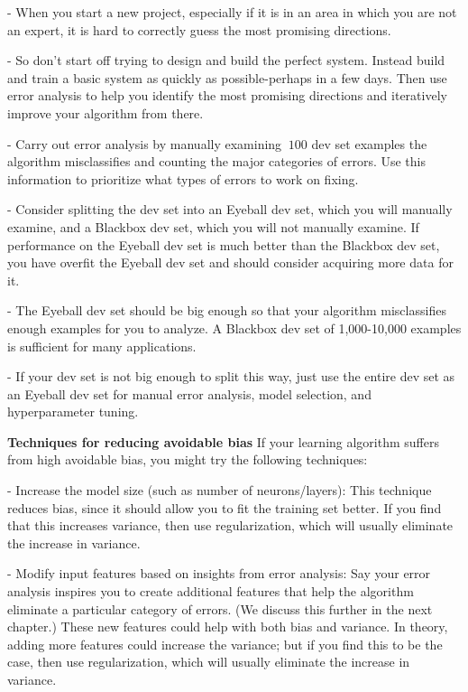 \documentclass[openany]{book}
\begin{document}
- When you start a new project, especially if it is in an area in which you are not an expert, it is hard to correctly guess the most promising directions.

- So don't start off trying to design and build the perfect system. Instead build and train a basic system as quickly as possible-perhaps in a few days. Then use error analysis to help you identify the most promising directions and iteratively improve your algorithm from there.

- Carry out error analysis by manually examining $~ 100$ dev set examples the algorithm misclassifies and counting the major categories of errors. Use this information to prioritize what types of errors to work on fixing.

- Consider splitting the dev set into an Eyeball dev set, which you will manually examine, and a Blackbox dev set, which you will not manually examine. If performance on the Eyeball dev set is much better than the Blackbox dev set, you have overfit the Eyeball dev set and should consider acquiring more data for it.

- The Eyeball dev set should be big enough so that your algorithm misclassifies enough examples for you to analyze. A Blackbox dev set of 1,000-10,000 examples is sufficient for many applications.

- If your dev set is not big enough to split this way, just use the entire dev set as an Eyeball dev set for manual error analysis, model selection, and hyperparameter tuning.


\textbf{Techniques for reducing avoidable bias
}If your learning algorithm suffers from high avoidable bias, you might try the following techniques:

- Increase the model size (such as number of neurons/layers): This technique reduces bias, since it should allow you to fit the training set better. If you find that this increases variance, then use regularization, which will usually eliminate the increase in variance.

- Modify input features based on insights from error analysis: Say your error analysis inspires you to create additional features that help the algorithm eliminate a particular category of errors. (We discuss this further in the next chapter.) These new features could help with both bias and variance. In theory, adding more features could increase the variance; but if you find this to be the case, then use regularization, which will usually eliminate the increase in variance.
\end{document}
